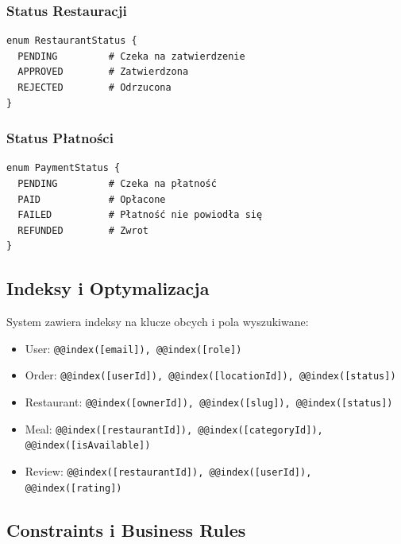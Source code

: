 \documentclass[12pt,a4paper,utf-8]{article}
\begin{document}
\subsubsection{Status Restauracji}

\begin{verbatim}
enum RestaurantStatus {
  PENDING         # Czeka na zatwierdzenie
  APPROVED        # Zatwierdzona
  REJECTED        # Odrzucona
}
\end{verbatim}

\subsubsection{Status Płatności}

\begin{verbatim}
enum PaymentStatus {
  PENDING         # Czeka na płatność
  PAID            # Opłacone
  FAILED          # Płatność nie powiodła się
  REFUNDED        # Zwrot
}
\end{verbatim}

\subsection{Indeksy i Optymalizacja}

System zawiera indeksy na klucze obcych i pola wyszukiwane:

\begin{itemize}
    \item User: \texttt{@@index([email]), @@index([role])}
    \item Order: \texttt{@@index([userId]), @@index([locationId]), @@index([status])}
    \item Restaurant: \texttt{@@index([ownerId]), @@index([slug]), @@index([status])}
    \item Meal: \texttt{@@index([restaurantId]), @@index([categoryId]), @@index([isAvailable])}
    \item Review: \texttt{@@index([restaurantId]), @@index([userId]), @@index([rating])}
\end{itemize}

\subsection{Constraints i Business Rules}
\end{document}

